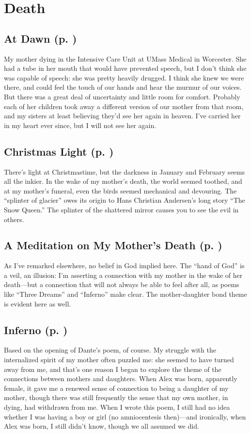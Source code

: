 \section*{Death}

\subsection{At Dawn (p. \pageref{ch:atdawn})}
My mother dying in the Intensive Care Unit at UMass Medical in Worcester. She
had a tube in her mouth that would have prevented speech, but I don't think she
was capable of speech: she was pretty heavily drugged. I think she knew we were
there, and could feel the touch of our hands and hear the murmur of our voices.
But there was a great deal of uncertainty and little room for comfort. Probably
each of her children took away a different version of our mother from that room,
and my sisters at least believing they'd see her again in heaven. I've carried
her in my heart ever since, but I will not see her again.

\subsection{Christmas Light (p. \pageref{ch:christmaslight})}
There's light at Christmastime, but the darkness in January and February seems
all the inkier. In the wake of my mother's death, the world seemed toothed, and
at my mother's funeral, even the birds seemed mechanical and devouring. The
``splinter of glacier'' owes its origin to Hans Christian Andersen's long story
``The Snow Queen.'' The splinter of the shattered mirror causes you to see the
evil in others.

\subsection{A Meditation on My Mother's Death (p. \pageref{ch:ameditation})}
As I've remarked elsewhere, no belief in God implied here. The ``hand of God''
is a veil, an illusion: I'm asserting a connection with my mother in the wake of
her death---but a connection that will not always be able to feel after all, as
poems like ``Three Dreams'' and ``Inferno'' make clear. The mother-daughter bond
theme is evident here as well.

\subsection{Inferno (p. \pageref{ch:inferno})}
Based on the opening of Dante's poem, of course. My struggle with the
internalized spirit of my mother often puzzled me: she seemed to have turned
away from me, and that's one reason I began to explore the theme of the
connections between mothers and daughters. When Alex was born, apparently
female, it gave me a renewed sense of connection to being a daughter of my
mother, though there was still frequently the sense that my own mother, in
dying, had withdrawn from me. When I wrote this poem, I still had no idea
whether I was having a boy or girl (no amniocentesis then)---and ironically,
when Alex was born, I still didn't know, though we all assumed we did.

